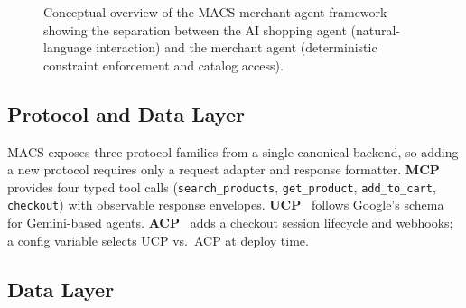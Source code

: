 \documentclass[sigconf,anonymous]{acmart}
\begin{document}
\begin{figure}[t]
\caption{Conceptual overview of the MACS merchant-agent framework showing the
  separation between the AI shopping agent (natural-language interaction) and
  the merchant agent (deterministic constraint enforcement and catalog access).}
\label{fig:concept}
\end{figure}

\subsection{Protocol and Data Layer}

MACS exposes three protocol families from a single canonical backend, so
adding a new protocol requires only a request adapter and response formatter.
\textbf{MCP}~\cite{Anthropic2024MCP} provides four typed tool calls
(\texttt{search\_products}, \texttt{get\_product}, \texttt{add\_to\_cart},
\texttt{checkout}) with observable response envelopes.
\textbf{UCP}~\cite{UCPGoogle2026} follows Google's schema for Gemini-based agents.
\textbf{ACP}~\cite{ACPOpenAI2025} adds a checkout session lifecycle and webhooks;
a config variable selects UCP vs.\ ACP at deploy time.

\subsection{Data Layer}
\end{document}
